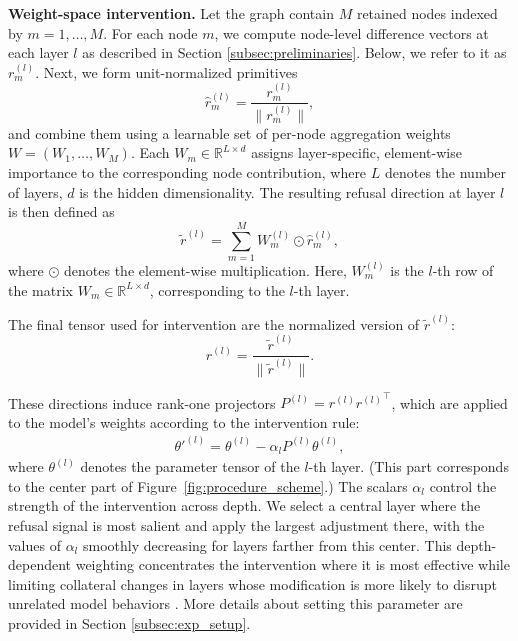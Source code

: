 \documentclass{article}
\theoremstyle{plain}
\theoremstyle{definition}
\theoremstyle{remark}
\begin{document}

\textbf{Weight-space intervention.} 
Let the graph contain $M$ retained nodes indexed by $m=1,\dots,M$. For each node $m$, we compute node-level difference vectors at each layer $l$ as described in Section \ref{subsec:preliminaries}. Below, we refer to it as $r^{(l)}_m$. Next, we form unit-normalized primitives
\[
\hat r^{(l)}_m = \frac{r^{(l)}_m}{\|r^{(l)}_m\|},
\]
and combine them using a learnable set of per-node aggregation weights $W=(W_1,\dots,W_M)$. Each $W_m \in \mathbb{R}^{L \times d}$ assigns layer-specific, element-wise importance to the corresponding node contribution, where $L$ denotes the number of layers, $d$ is the hidden dimensionality. The resulting refusal direction at layer $l$ is then defined as
\[
\tilde r^{(l)} = \sum\limits_{m=1}^M W_m^{(l)} \odot \hat r^{(l)}_m,
\]
where $\odot$ denotes the element-wise multiplication. Here, $W_m^{(l)}$ is the $l$-th row of the matrix $W_m \in \mathbb{R}^{L \times d}$, corresponding to the $l$-th layer.

The final tensor used for intervention are the normalized version of $\tilde r^{(l)}$:
\[
r^{(l)} = \frac{\tilde r^{(l)}}{\|\tilde r^{(l)}\|}.
\]

These directions induce rank-one projectors $P^{(l)}=r^{(l)}{r^{(l)}}^\top$, which are applied to the model's weights according to the intervention rule:
\begin{align}
\label{eq:weight_change}
\theta'^{(l)} = \theta^{(l)} - \alpha_l  P^{(l)} \theta^{(l)},
\end{align}
where $\theta^{(l)}$ denotes the parameter tensor of the $l$-th layer. (This part corresponds to the center part of Figure~\ref{fig:procedure_scheme}.) The scalars $\alpha_l$ control the strength of the intervention across depth. We select a central layer where the refusal signal is most salient and apply the largest adjustment there, with the values of $\alpha_l$ smoothly decreasing for layers farther from this center. This depth-dependent weighting concentrates the intervention where it is most effective while limiting collateral changes in layers whose modification is more likely to disrupt unrelated model behaviors \cite{heretic}. More details about setting this parameter are provided in Section \ref{subsec:exp_setup}.
\end{document}
